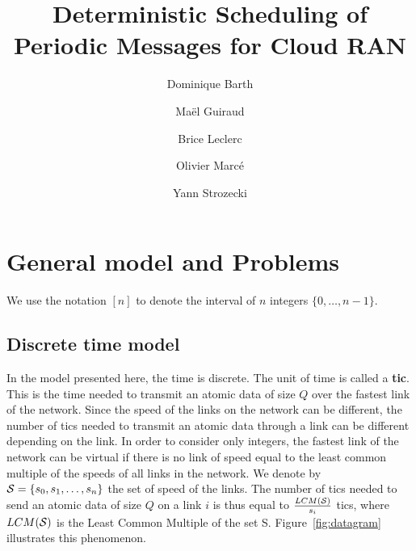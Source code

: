 \documentclass[10pt]{article}
\title{Deterministic Scheduling of Periodic Messages for Cloud RAN}
\author[1]{Dominique Barth}
\author[1,2]{Ma\"el Guiraud}
\author[2]{Brice Leclerc}
\author[2]{Olivier Marc\'e}
\author[1]{Yann Strozecki}
\affil[1]{David Laboratory, UVSQ}
\affil[2]{Nokia Bell Labs France}
\begin{document}
\maketitle

\section{General model and Problems}\label{sec:def}

We use the notation $[n]$ to denote the interval of $n$ integers $\{0,\dots,n-1\}$.

  \subsection{Discrete time model}
  In the model presented here, the time is discrete. The unit of time  is called a {\bf tic}. This is the time needed to transmit an atomic data of size $Q$ over the fastest link of the network. Since the speed of the links on the network can be different, the number of tics needed to transmit an atomic data through a link can be different depending on the link. In order to consider only integers, the fastest link of the network can be virtual if there is no link of speed equal to the least common multiple of the speeds of all links in the network. We denote by ${\cal S} = \{s_0,s_1,\ldots,s_n\}$ the set of speed of the links. The number of tics needed to send an atomic data of size $Q$ on a link $i$ is thus equal to $\frac{LCM({\cal S})}{s_i}$ tics, where $LCM({\cal S})$ is the Least Common Multiple of the set {\cal S}. Figure~\ref{fig:datagram} illustrates this phenomenon.
  
\end{document}
